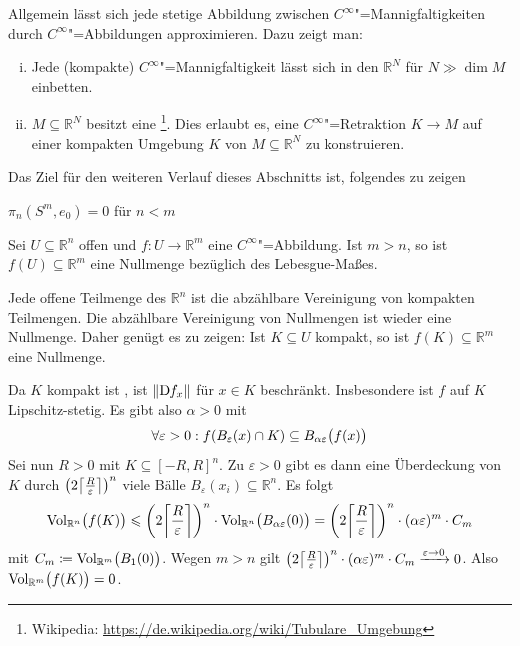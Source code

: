 \begin{bemerkung}[{name=[Approximation beliebiger stetige Abbildungen zwischen Mannigfaltigkeiten]}]
	Allgemein lässt sich jede stetige Abbildung zwischen $C^\infty$"=Mannigfaltigkeiten durch $C^\infty$"=Abbildungen approximieren. Dazu zeigt man:
	\begin{enumerate}[(i)]
		\item Jede (kompakte) $C^\infty$"=Mannigfaltigkeit lässt sich in den $\mathbb{R}^N$ für $N \gg \dim M$ einbetten.
		\item $M \subseteq \mathbb{R}^N$ besitzt eine \footnote{Wikipedia: \url{https://de.wikipedia.org/wiki/Tubulare_Umgebung}}. 
		Dies erlaubt es, eine $C^\infty$"=Retraktion $K \to M$ auf einer kompakten Umgebung $K$ von $M \subseteq \mathbb{R}^N$ zu konstruieren.
	\end{enumerate}
\end{bemerkung}

Das Ziel für den weiteren Verlauf dieses Abschnitts ist, folgendes zu zeigen
\begin{center}
	$\pi_n(S^m, e_0) = 0$ für $n <m$ 
\end{center}

\begin{proposition}[{name=[glatte Abbildungen in höherdimensionalen Raum haben Bild mit Maß Null]},label=prop:glatt-nullmenge]
	Sei $U \subseteq \mathbb{R}^n$ offen und $f \colon U \to \mathbb{R}^m$ eine $C^\infty$"=Abbildung. 
	Ist $m > n$, so ist $f(U) \subseteq \mathbb{R}^m$ eine Nullmenge bezüglich des Lebesgue-Maßes.
\end{proposition}
\begin{beweis}
	Jede offene Teilmenge des $\mathbb{R}^n$ ist die abzählbare Vereinigung von kompakten Teilmengen. 
	Die abzählbare Vereinigung von Nullmengen ist wieder eine Nullmenge. 
	Daher genügt es zu zeigen: Ist $K \subseteq U$ kompakt, so ist $f(K) \subseteq \mathbb{R}^m$ eine Nullmenge. 

	Da $K$ kompakt ist , ist $\norm{\D f_x} $ für $x \in K$ beschränkt. 
	Insbesondere ist $f$ auf $K$ Lipschitz-stetig. 
	Es gibt also $\alpha >0$ mit 
	\[
		\forall \varepsilon > 0 : f \enbrace*{B_\varepsilon(x) \cap K} \subseteq B_{\alpha \varepsilon} \enbrace[\big]{f(x)}  
	\]
	Sei nun $R >0$ mit $K \subseteq [-R,R]^n$. 
	Zu $\varepsilon>0$ gibt es dann eine Überdeckung von $K$ durch $\enbrace*{2 \ceil*{\frac{R}{\varepsilon}}}^n$ viele Bälle 
	$B_\varepsilon(x_i) \subseteq \mathbb{R}^n$. Es folgt 
	\[
		\Vol_{\mathbb{R}^n}\enbrace[\big]{f(K)} \le \enbrace*{2  \ceil*{\frac{R}{\varepsilon}}}^n \cdot \Vol_{\mathbb{R}^n} \enbrace[\big]{B_{\alpha \varepsilon}(0)} = \enbrace*{2 \ceil*{\frac{R}{\varepsilon}}}^n \cdot (\alpha \varepsilon)^m \cdot C_m
	\]
	mit $C_m \coloneqq \Vol_{\mathbb{R}^m} \enbrace[\big]{B_1(0)}$. 
	Wegen $m >n$ gilt $\enbrace*{2 \ceil*{\frac{R}{\varepsilon}}}^n \cdot (\alpha \varepsilon)^m \cdot C_m \xrightarrow{\varepsilon \to 0} 0$.  
	Also $\Vol_{\mathbb{R}^m} \enbrace[\big]{f(K)}=0$.
\end{beweis}

